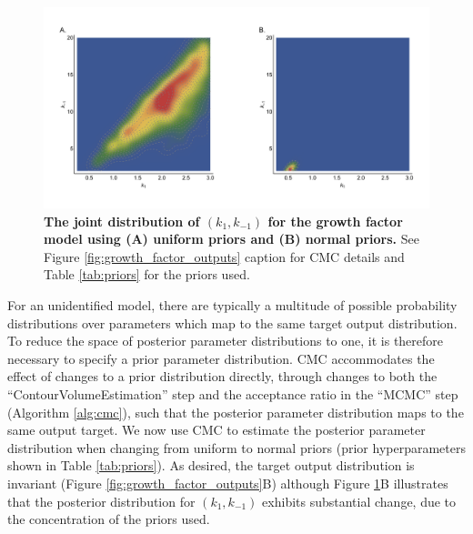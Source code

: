 \documentclass[10pt,letterpaper]{article}
\begin{document}
\begin{figure}[H]
	\centerline{\includegraphics[width=\textwidth]{../figures/growth_factor_inputs.png}}
	\caption{\textbf{The joint distribution of $(k_1,k_{-1})$ for the growth factor model using (A) uniform priors and (B) normal priors.} See Figure \ref{fig:growth_factor_outputs} caption for CMC details and Table \ref{tab:priors} for the priors used.}
	\label{fig:growth_factor_inputs}
\end{figure}

For an unidentified model, there are typically a multitude of possible probability distributions over parameters which map to the same target output distribution. To reduce the space of posterior parameter distributions to one, it is therefore necessary to specify a prior parameter distribution. CMC accommodates the effect of changes to a prior distribution directly, through changes to both the ``ContourVolumeEstimation'' step and the acceptance ratio in the ``MCMC'' step (Algorithm \ref{alg:cmc}), such that the posterior parameter distribution maps to the same output target. We now use CMC to estimate the posterior parameter distribution when changing from uniform to normal priors (prior hyperparameters shown in Table \ref{tab:priors}). As desired, the target output distribution is invariant (Figure \ref{fig:growth_factor_outputs}B) although Figure \ref{fig:growth_factor_inputs}B illustrates that the posterior distribution for $(k_1,k_{-1})$ exhibits substantial change, due to the concentration of the priors used.
\end{document}
